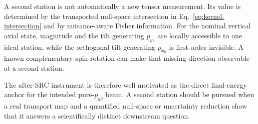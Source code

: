 \documentclass[11pt,a4paper]{article}
\begin{document}
A second station is not automatically a new tensor measurement.  Its value is
determined by the transported null-space intersection in
Eq.~\eqref{eq:kernel-intersection} and by nuisance-aware Fisher information.
For the nominal vertical axial state, magnitude and the tilt generating
$p_{yz}$ are locally accessible to one ideal station, while the orthogonal tilt
generating $p_{xy}$ is first-order invisible.  A known complementary spin
rotation can make that missing direction observable at a second station.

The after-SRC instrument is therefore well motivated as the direct final-energy
anchor for the intended pure-$p_{yy}$ beam.  A second station should be pursued
when a real transport map and a quantified null-space or uncertainty reduction
show that it answers a scientifically distinct downstream question.
\end{document}
